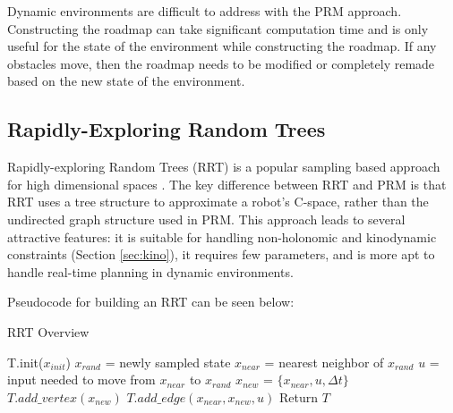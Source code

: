 \documentclass[10pt,conference]{ieeeconf}
\begin{document}
Dynamic environments are difficult to address with the PRM approach. Constructing the roadmap can take significant computation time and is only useful for the state of the environment while constructing the roadmap. If any obstacles move, then the roadmap needs to be modified or completely remade based on the new state of the environment.


\subsection{Rapidly-Exploring Random Trees}

Rapidly-exploring Random Trees (RRT) is a popular sampling based approach for high dimensional spaces \cite{RRT}. The key difference between RRT and PRM is that RRT uses a tree structure to approximate a robot's C-space, rather than the undirected graph structure used in PRM. This approach leads to several attractive features: it is suitable for handling non-holonomic and kinodynamic constraints (Section \ref{sec:kino}), it requires few parameters, and is more apt to handle real-time planning in dynamic environments. 



Pseudocode for building an RRT can be seen below:

\begin{algorithm}
\caption{RRT Overview}
\begin{algorithmic}[1]
\State T.init($x_{init}$)
\State $x_{rand}$ = newly sampled state
\State $x_{near}$ = nearest neighbor of $x_{rand}$
\State $u$ = input needed to move from $x_{near}$ to $x_{rand}$
\State $x_{new}$ = $\{x_{near}, u, \Delta t\}$
\State $T.add\_vertex(x_{new})$
\State $T.add\_edge(x_{near}, x_{new}, u)$
\EndWhile
\State Return $T$
\EndFunction
\end{algorithmic}
\end{algorithm}
\end{document}
